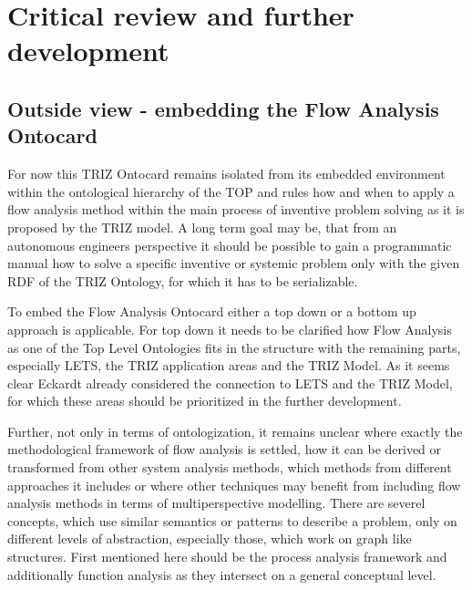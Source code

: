 \documentclass[a4paper,11pt]{article}
\begin{document}
    \section{Critical review and further development}
        \subsection{Outside view - embedding the Flow Analysis Ontocard}
        For now this TRIZ Ontocard remains isolated from its embedded environment within the ontological hierarchy of the TOP and rules how and when to 
        apply a flow analysis method within the main process of inventive problem solving as it is proposed by the TRIZ model. A long term goal may be,
        that from an autonomous engineers perspective it should be possible to gain a programmatic manual how to solve a specific inventive or systemic
        problem only with the given RDF of the TRIZ Ontology, for which it has to be serializable.

        To embed the Flow Analysis Ontocard either a top down or a bottom up approach is applicable. For top down it needs to be clarified how
        Flow Analysis as one of the Top Level Ontologies fits in the structure with the remaining parts, especially LETS, the TRIZ application areas and
        the TRIZ Model. As it seems clear Eckardt already considered the connection to LETS and the TRIZ Model, for which these areas should be prioritized
        in the further development.
        
        Further, not only in terms of ontologization, it remains unclear where exactly the methodological framework of flow
        analysis is settled, how it can be derived or transformed from other system analysis methods, which methods from different approaches it includes
        or where other techniques may benefit from including flow analysis methods in terms of multiperspective modelling. There are severel concepts, 
        which use similar semantics or patterns to describe a problem, only on different levels of abstraction, especially those, which work on graph
        like structures. First mentioned here should be the process analysis framework and additionally function analysis as they intersect on a general
        conceptual level.
\end{document}
